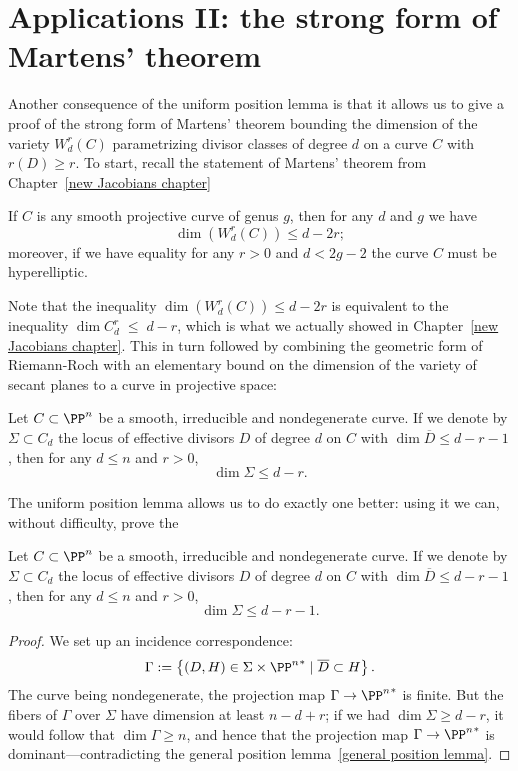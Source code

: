 \section{Applications II: the strong form of Martens' theorem}

Another consequence of the uniform position lemma is that it allows us to give a proof of the strong form of Martens' theorem bounding the dimension of the variety $W^r_d(C)$ parametrizing divisor classes of degree $d$ on a curve $C$ with $r(D) \geq r$.
To start, recall the statement of Martens' theorem from Chapter~\ref{new Jacobians chapter}

\begin{theorem}
If $C$ is any smooth projective curve of genus $g$, then for any $d$ and $g$ we have
$$
\dim(W^r_d(C)) \leq d-2r;
$$
moreover, if we have equality for any $r > 0$ and $d < 2g-2$ the curve $C$ must be hyperelliptic.
\end{theorem}

Note that the inequality $\dim(W^r_d(C)) \leq d-2r$ is equivalent to the inequality $\dim C^r_d \; \leq \; d-r$, which is what we actually showed in Chapter~\ref{new Jacobians chapter}. This in turn followed by combining the geometric form of Riemann-Roch with an elementary bound on the dimension of the variety of secant planes to a curve in projective space:

\begin{lemma}
Let $C \subset \PP^n$ be a smooth, irreducible and nondegenerate curve. If we denote by $\Sigma \subset C_d$ the locus of effective divisors $D$ of degree $d$ on $C$ with $\dim \overline D \leq d-r-1$, then for any $d \leq n$ and $r > 0$,
$$
\dim \Sigma \leq d-r.
$$
\end{lemma}

The uniform position lemma allows us to do exactly one better: using it we can, without difficulty, prove the

\begin{lemma}\label{Strong secant plane lemma}
Let $C \subset \PP^n$ be a smooth, irreducible and nondegenerate curve. If we denote by $\Sigma \subset C_d$ the locus of effective divisors $D$ of degree $d$ on $C$ with $\dim \overline D \leq d-r-1$, then for any $d \leq n$ and $r > 0$,
$$
\dim \Sigma \leq d-r-1.
$$
\end{lemma}

\begin{proof}
We set up an incidence correspondence: 
$$
\Gamma := \left\{ (D, H) \in \Sigma \times {\PP^n}^* \mid \overline D \subset H \right\}.
$$
The curve being nondegenerate, the projection map $\Gamma \to  {\PP^n}^*$ is finite. But the fibers of $\Gamma$ over $\Sigma$ have dimension at least $n-d+r$; if we had $\dim \Sigma \geq d-r$, it would follow that $\dim \Gamma \geq n$, and hence that the projection map $\Gamma \to  {\PP^n}^*$ is dominant---contradicting the general position lemma~\ref{general position lemma}.
\end{proof}

